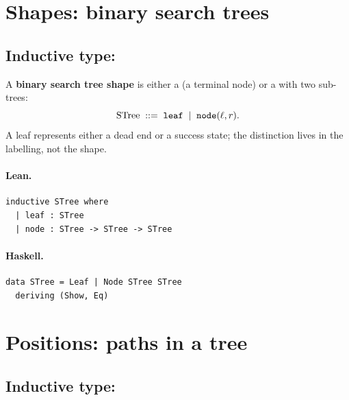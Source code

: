 \documentclass[11pt,a4paper]{article}
\begin{document}
\section{Shapes: binary search trees}

\subsection{Inductive type: }

\begin{defn}
A \textbf{binary search tree shape} is either a  (a terminal node)
or a  with two sub-trees:
\[
  \mathrm{STree} \;::=\; \texttt{leaf} \;\mid\; \texttt{node}(\ell, r).
\]
A leaf represents either a dead end or a success state; the distinction lives
in the labelling, not the shape.
\end{defn}

\paragraph{Lean.}
\begin{lstlisting}[style=lean]
inductive STree where
  | leaf : STree
  | node : STree -> STree -> STree
\end{lstlisting}

\paragraph{Haskell.}
\begin{lstlisting}[style=haskell]
data STree = Leaf | Node STree STree
  deriving (Show, Eq)
\end{lstlisting}


\section{Positions: paths in a tree}

\subsection{Inductive type: }
\end{document}
